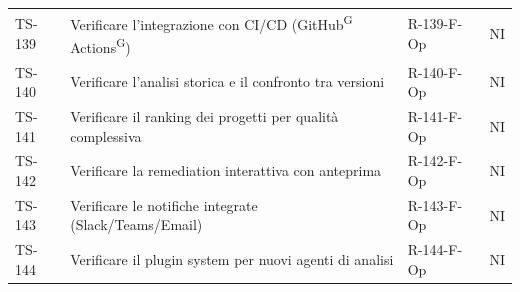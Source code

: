 \documentclass[a4paper, 11pt]{article}
\begin{document}
\begin{longtable}{>{\centering\arraybackslash}m{1.4cm} >{\raggedright\arraybackslash}p{7.2cm} >{\centering\arraybackslash}m{2.5cm} >{\centering\arraybackslash}m{2.2cm}}
TS-139 & Verificare l'integrazione con CI/CD (GitHub\textsuperscript{G} Actions\textsuperscript{G}) & R-139-F-Op & NI \\
TS-140 & Verificare l'analisi storica e il confronto tra versioni & R-140-F-Op & NI \\
TS-141 & Verificare il ranking dei progetti per qualità complessiva & R-141-F-Op & NI \\
TS-142 & Verificare la remediation interattiva con anteprima & R-142-F-Op & NI \\
TS-143 & Verificare le notifiche integrate (Slack/Teams/Email) & R-143-F-Op & NI \\
TS-144 & Verificare il plugin system per nuovi agenti di analisi & R-144-F-Op & NI \\

\end{longtable}
\end{document}
